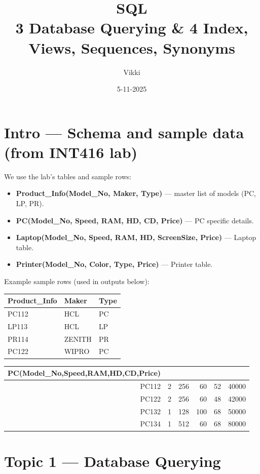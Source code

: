 \documentclass[11pt,a4paper]{article}
\title{SQL\\
	  3 Database Querying \& 4 Index, Views, Sequences, Synonyms}
\author{Vikki}
\date{5-11-2025}
\begin{document}
	\maketitle
	\tableofcontents
	\bigskip
	
	\section{Intro — Schema and sample data (from INT416 lab)}
	\noindent We use the lab's tables and sample rows:
	
	\begin{itemize}
		\item \textbf{Product\_Info(Model\_No, Maker, Type)} — master list of models (PC, LP, PR).  
		\item \textbf{PC(Model\_No, Speed, RAM, HD, CD, Price)} — PC specific details.  
		\item \textbf{Laptop(Model\_No, Speed, RAM, HD, ScreenSize, Price)} — Laptop table.  
		\item \textbf{Printer(Model\_No, Color, Type, Price)} — Printer table.
	\end{itemize}
	
	\noindent Example sample rows (used in outputs below):
	
	\begin{center}
		\begin{tabular}{lll}
			\toprule
			Product\_Info & Maker & Type \\
			\midrule
			PC112 & HCL & PC \\
			LP113 & HCL & LP \\
			PR114 & ZENITH & PR \\
			PC122 & WIPRO & PC \\
			\bottomrule
		\end{tabular}
		\qquad
		\begin{tabular}{rrrrr}
			\toprule
			PC(Model\_No,Speed,RAM,HD,CD,Price) \\
			\midrule
			PC112 & 2 & 256 & 60 & 52 & 40000 \\
			PC122 & 2 & 256 & 60 & 48 & 42000 \\
			PC132 & 1 & 128 &100 & 68 & 50000 \\
			PC134 & 1 & 512 &60 & 68 & 80000 \\
			\bottomrule
		\end{tabular}
	\end{center}
	
	\newpage
	\section{Topic 1 — Database Querying}
\end{document}
